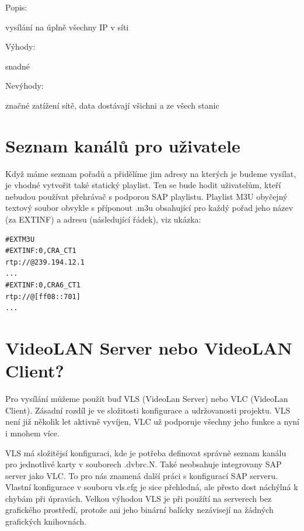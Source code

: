 \begin{bf}Popis:\end{bf} vysílání na úplně všechny IP v síti
 

\begin{bf}Výhody:\end{bf} snadné


\begin{bf}Nevýhody:\end{bf} značné zatížení sítě, data dostávají všichni a ze všech stanic

\vspace{10pt}

\section{Seznam kanálů pro uživatele}

Když máme seznam pořadů a přidělíme jim adresy na kterých je budeme vysílat, je vhodné vytvořit také statický playlist. Ten se bude hodit uživatelům, kteří nebudou používat přehrávač s podporou SAP playlistu. Playlist M3U obyčejný textový soubor obvykle s příponout .m3u obsahující pro každý pořad jeho název (za EXTINF) a adresu (následující řádek), viz ukázka:

\vspace{10pt}

\begin{small}
\begin{verbatim}
#EXTM3U
#EXTINF:0,CRA_CT1
rtp://@239.194.12.1
...
#EXTINF:0,CRA6_CT1
rtp://@[ff08::701]
...
\end{verbatim}
\end{small}

\vspace{10pt}

\section{VideoLAN Server nebo VideoLAN Client?}

Pro vysílání můžeme použít buď VLS (VideoLan Server) nebo VLC (VideoLan Client). Zásadní rozdíl je ve složitosti konfigurace a udržovanosti projektu. VLS není již několik let aktivně vyvíjen, VLC už podporuje všechny jeho funkce a nyní i mnohem více.

VLS má složitějsí konfiguraci, kde je potřeba definovat správně seznam kanálu pro jednotlivé karty v souborech .dvbrc.N. Také neobsahuje integrovany SAP server jako VLC. To pro nás znamená další práci s konfigurací SAP serveru. Vlastní konfigurace v souboru vls.cfg je sice přehledná, ale přesto dost náchýlná k chybám při úpravách. Velkou výhodou VLS je při použítí na serverech bez grafického prostředí, protože ani jeho binární balícky nezávisejí na žádných grafických knihovnách.

